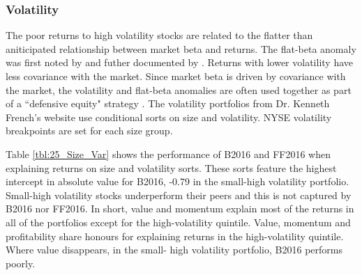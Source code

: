 
\subsubsection{Volatility}




The poor returns to high volatility stocks are related to the flatter than aniticipated
relationship between market beta and returns. The flat-beta anomaly was first noted by
\textcite{jensen1972capital} and futher documented by \textcite{fama1973risk}. Returns
with lower volatility have less covariance with the market. Since market beta is driven by
covariance with the market, the volatility and flat-beta anomalies are often used together
as part of a ``defensive equity" strategy \parencite{frazzini2014betting}. The volatility
portfolios from Dr. Kenneth French's website use conditional sorts on size and volatility.
NYSE volatility breakpoints are set for each size group.

Table \ref{tbl:25_Size_Var} shows the performance of B2016 and FF2016 when explaining
returns on size and volatility sorts. These sorts feature the highest intercept in
absolute value for B2016, -0.79 in the small-high volatility portfolio. Small-high
volatility stocks underperform their peers and this is not captured by B2016 nor FF2016.
In short, value and momentum explain most of the returns in all of the portfolios except
for the high-volatility quintile. Value, momentum and profitability share honours for
explaining returns in the high-volatility quintile. Where value disappears, in the small-
high volatility portfolio, B2016 performs poorly.

